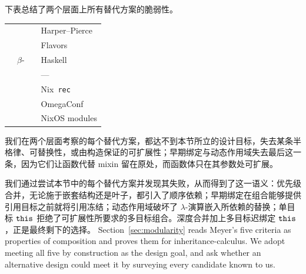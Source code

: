 \begin{CJK*}{UTF8}{gbsn}
\noindent
下表总结了两个层面上所有替代方案的脆弱性。

{\small\typewriterInlineCodeInHtml
\begin{center}
  \begin{tabular}{llL{0.3\textwidth}L{0.3\textwidth}}
    &  & 
    &  \\
    \hline
    & 
    & 
    & Harper--Pierce \\
    & 
    & 
    & Flavors \\
    & $\beta$-
    & 
    & Haskell \\
    & 
    & 
    & --- \\
    \hline
    & 
    & 
    & Nix~\texttt{rec} \\
    & 
    & 
    & OmegaConf \\
    & 
    & 
    & NixOS modules \\
  \end{tabular}
\end{center}
}

\noindent
我们在两个层面考察的每个替代方案，都达不到本节所立的设计目标，失去某条半格律、可替换性，或由构造保证的可扩展性；早期绑定与动态作用域失去最后这一条，因为它们让函数代替 mixin 留在原处，而函数体只在其参数处可扩展。

我们通过尝试本节中的每个替代方案并发现其失败，从而得到了这一语义：优先级合并，无论施于嵌套结构还是叶子，都引入了顺序依赖；早期绑定在组合能够提供引用目标之前就将引用冻结；动态作用域破坏了 $\lambda$-演算嵌入所依赖的替换；单目标 $\mathtt{this}$ 拒绝了可扩展性所要求的多目标组合。深度合并加上多目标迟绑定 $\mathtt{this}$，正是最终剩下的选择。
\else
Section~\ref{sec:modularity} reads Meyer's five criteria as properties of composition and proves them
for inheritance-calculus. We adopt meeting all five by construction as the design goal, and ask whether
an alternative design could meet it by surveying every candidate known to us.


\end{CJK*}
